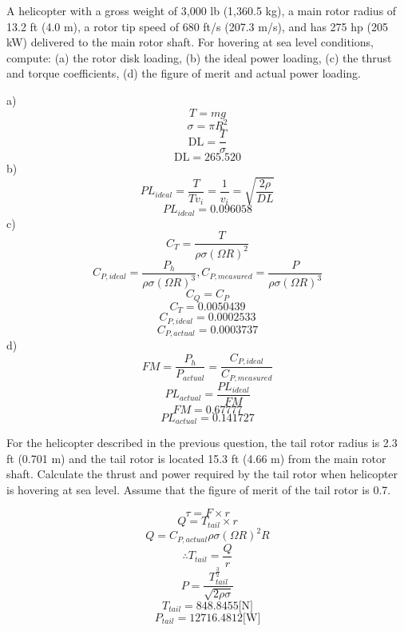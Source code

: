 \documentclass[12pt]{exam}
\begin{document}
\begin{questions}
\begin{solutionorbox}[\stretch{1}]
\end{solutionorbox}


\newpage 
\begin{question}
A helicopter with a gross weight of 3,000 lb (1,360.5 kg), a main rotor radius of 13.2 ft
(4.0 m), a rotor tip speed of 680 ft/s (207.3 m/s), and has 275 hp (205 kW) delivered to the
main rotor shaft. For hovering at sea level conditions, compute: (a) the rotor disk loading,
(b) the ideal power loading, (c) the thrust and torque coefficients, (d) the figure of merit
and actual power loading.
\end{question}
\begin{solutionorbox}[\stretch{1}]
a)
\[ T = mg \]
\[ \sigma = \pi R^2 \]
\[ \text{DL} = \frac{T}{\sigma} \]
\[\text{DL} = 265.520\]
b)
\[PL_{ideal} = \frac{T}{Tv_i} = \frac{1}{v_i} = \sqrt{\frac{2\rho}{DL}}\]
\[PL_{ideal} = 0.096058\]
c)
\[ C_T = \frac{T}{\rho\sigma(\Omega R)^2} \]
\[ C_{P,ideal} = \frac{P_h}{\rho\sigma(\Omega R)^3},C_{P,measured} = \frac{P}{\rho\sigma(\Omega R)^3} \]
\[C_Q = C_P\]
\[C_T = 0.0050439\]
\[C_{P,ideal} = 0.0002533\]
\[C_{P,actual} = 0.0003737\]
d)
\[ FM = \frac{P_h}{P_{actual}} = \frac{C_{P,ideal}}{C_{P,measured}} \]
\[ PL_{actual} = \frac{PL_{ideal}}{FM} \]
\[FM = 0.67777\]
\[PL_{actual} = 0.141727\]
\end{solutionorbox}


\newpage 
\begin{question}
For the helicopter described in the previous question, the tail rotor radius is 2.3 ft (0.701
m) and the tail rotor is located 15.3 ft (4.66 m) from the main rotor shaft. Calculate the
thrust and power required by the tail rotor when helicopter is hovering at sea level. Assume
that the figure of merit of the tail rotor is 0.7.
\end{question}
\begin{solutionorbox}[\stretch{1}]
\[ \tau = F \times r \]
\[ Q = T_{tail} \times r \]
\[ Q = C_{P,actual} \rho \sigma \left(\Omega R\right)^2 R \]
\[ \therefore T_{tail} = \frac{Q}{r} \]
\[ P = \frac{T_{tail}^\frac{3}{2}}{\sqrt{2\rho\sigma}} \]
\[T_{tail} = 848.8455 \text{[N]}\]
\[P_{tail} = 12716.4812 \text{[W]}\]
\end{solutionorbox}


\end{questions}
\end{document}
